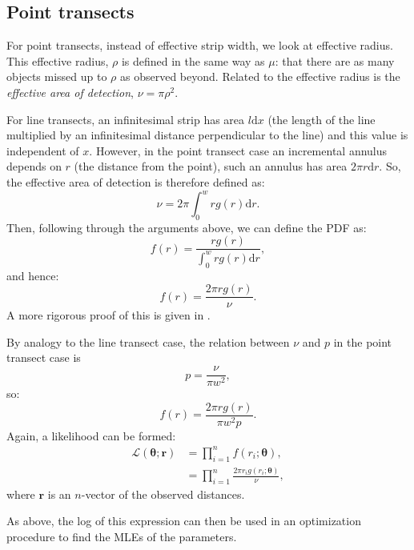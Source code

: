 \subsection{Point transects} 

For point transects, instead of effective strip width, we look at effective radius. This effective radius, $\rho$ is defined in the same way as $\mu$: that there are as many objects missed up to $\rho$ as observed beyond. Related to the effective radius is the \textit{effective area of detection}, $\nu=\pi \rho^2$.

For line transects, an infinitesimal strip has area $l\text{d}x$ (the length of the line multiplied by an infinitesimal distance perpendicular to the line) and this value is independent of $x$. However, in the point transect case an incremental annulus depends on $r$ (the distance from the point), such an annulus has area $2\pi r \text{d}r$. So, the effective area of detection is therefore defined as:
\begin{equation*}
\nu = 2 \pi \int_0^w r g(r) \text{d}r.
\end{equation*}
Then, following through the arguments above, we can define the PDF as:
\begin{equation*}
f(r) = \frac{r g(r)}{\int_0^w r g(r) \text{d}r},
\end{equation*}
and hence: 
\begin{equation*}
f(r) = \frac{2 \pi r g(r)}{\nu}.
\end{equation*}
A more rigorous proof of this is given in .

By analogy to the line transect case, the relation between $\nu$ and $p$ in the point transect case is
\begin{equation*}
p=\frac{\nu}{\pi w^2},
\end{equation*}
so:
\begin{equation*}
f(r) = \frac{2 \pi r g(r)}{\pi w^2 p}.
\end{equation*}
Again, a likelihood can be formed:
\begin{align*}
\mathcal{L}(\bm{\theta}; \bm{r}) &= \prod_{i=1}^n f(r_i;\bm{\theta}),\\
&= \prod_{i=1}^n \frac{2 \pi r_i g(r_i;\bm{\theta})}{\nu},
\end{align*}
where $\bm{r}$ is an $n$-vector of the observed distances. 

As above, the log of this expression can then be used in an optimization procedure to find the MLEs of the parameters.

